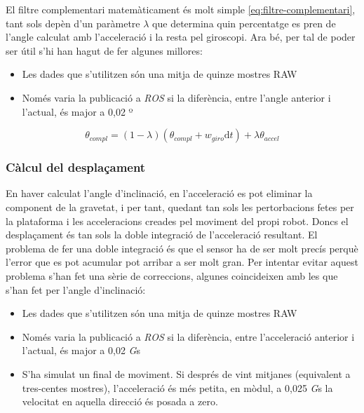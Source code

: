 \documentclass[12pt,a4paper,final,twoside]{report}
\begin{document}
El filtre complementari matemàticament és molt simple \eqref{eq:filtre-complementari}, tant sols depèn d'un paràmetre $\lambda$ que determina quin percentatge es pren de l'angle calculat amb l'acceleració i la resta pel giroscopi. Ara bé, per tal de poder ser útil s'hi han hagut de fer algunes millores:

\begin{itemize}
\item Les dades que s'utilitzen són una mitja de quinze mostres RAW
\item Només varia la publicació a \textit{ROS} si la diferència, entre l'angle anterior i l'actual, és major a 0,02 º
\end{itemize}

\begin{equation} 
\theta_{compl} = (1 - \lambda)(\theta_{compl} + w_{giro}\mathrm{d}t) + \lambda \theta_{accel} \label{eq:filtre-complementari}
\end{equation}


\subsubsection{Càlcul del desplaçament}

En haver calculat l'angle d'inclinació, en l'acceleració es pot eliminar la component de la gravetat, i per tant, quedant tan sols les pertorbacions fetes per la plataforma i les acceleracions creades pel moviment del propi robot. Doncs el desplaçament és tan sols la doble integració de l'acceleració resultant. El problema de fer una doble integració és que el sensor ha de ser molt precís perquè l'error que es pot acumular pot arribar a ser molt gran. Per intentar evitar aquest problema s'han fet una sèrie de correccions, algunes coincideixen amb les que s'han fet per l'angle d'inclinació:

\begin{itemize}
\item Les dades que s'utilitzen són una mitja de quinze mostres RAW
\item Només varia la publicació a \textit{ROS} si la diferència, entre l'acceleració anterior i l'actual, és major a 0,02 \textit{G}s 
\item S'ha simulat un final de moviment. Si després de vint mitjanes (equivalent a tres-centes mostres), l'acceleració és més petita, en mòdul, a 0,025 \textit{G}s la velocitat en aquella direcció és posada a zero.
\end{itemize}
\end{document}
